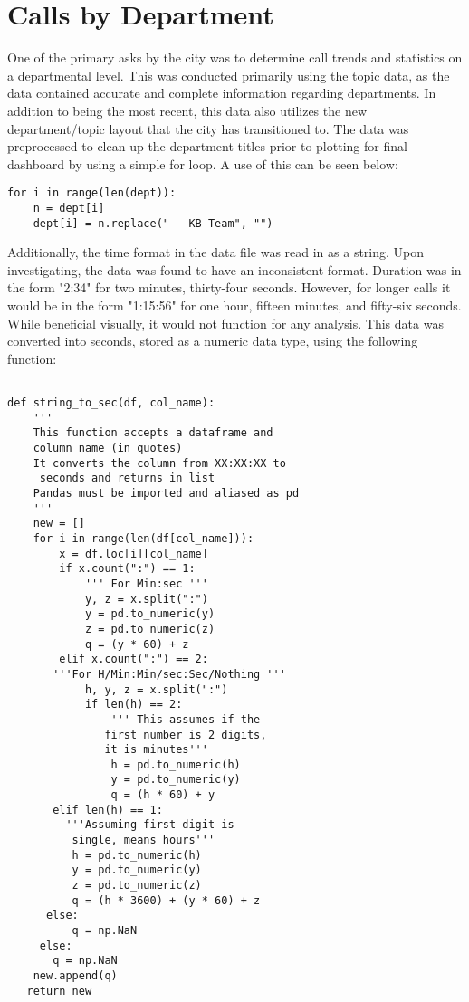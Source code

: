 \documentclass[11pt,twocolumn]{article}
\begin{document}
\section{Calls by Department}
One of the primary asks by the city was to determine call trends and statistics on a departmental level.  This was conducted primarily using the topic data, as the data contained accurate and complete information regarding departments.  In addition to being the most recent, this data also utilizes the new department/topic layout that the city has transitioned to.  The data was preprocessed to clean up the department titles prior to plotting for final dashboard by using a simple for loop.  A use of this can be seen below:\\

  \begin{Verbatim}[fontsize=\small]
  for i in range(len(dept)):
    n = dept[i]
    dept[i] = n.replace(" - KB Team", "")
  \end{Verbatim}


Additionally, the time format in the data file was read in as a string.  Upon investigating, the data was found to have an inconsistent format.  Duration was in the form "2:34" for two minutes, thirty-four seconds.  However, for longer calls it would be in the form "1:15:56" for one hour, fifteen minutes, and fifty-six seconds.  While beneficial visually, it would not function for any analysis.  This data was converted into seconds, stored as a numeric data type, using the following function:

  \begin{Verbatim}[fontsize=\small]
  
def string_to_sec(df, col_name):
    ''' 
    This function accepts a dataframe and 
    column name (in quotes)
    It converts the column from XX:XX:XX to
     seconds and returns in list
    Pandas must be imported and aliased as pd
    '''
    new = []
    for i in range(len(df[col_name])):
        x = df.loc[i][col_name]
        if x.count(":") == 1:
            ''' For Min:sec '''
            y, z = x.split(":")
            y = pd.to_numeric(y)
            z = pd.to_numeric(z)
            q = (y * 60) + z
        elif x.count(":") == 2:
       '''For H/Min:Min/sec:Sec/Nothing '''
            h, y, z = x.split(":")
            if len(h) == 2:
                ''' This assumes if the
               first number is 2 digits,
               it is minutes'''
                h = pd.to_numeric(h)
                y = pd.to_numeric(y)
                q = (h * 60) + y
       elif len(h) == 1:
         '''Assuming first digit is 
          single, means hours'''
          h = pd.to_numeric(h)
          y = pd.to_numeric(y)
          z = pd.to_numeric(z)
          q = (h * 3600) + (y * 60) + z
      else:
          q = np.NaN
     else:
       q = np.NaN
    new.append(q)
   return new
  \end{Verbatim}
\end{document}
